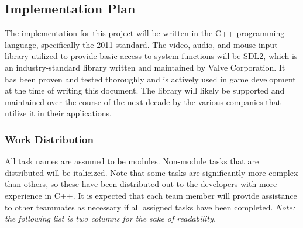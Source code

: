 \documentclass{article}
\begin{document}
	\subsection{Implementation Plan}
    The implementation for this project will be written in the C++ programming language, specifically the 2011 standard. The video, audio, and mouse input library utilized to provide basic access to system functions will be SDL2, which is an industry-standard library written and maintained by Valve Corporation. It has been proven and tested thoroughly and is actively used in game development at the time of writing this document. The library will likely be supported and maintained over the course of the next decade by the various companies that utilize it in their applications.
    \subsubsection{Work Distribution}
      All task names are assumed to be modules. Non-module tasks that are distributed will be italicized. Note that some tasks are significantly more complex than others, so these have been distributed out to the developers with more experience in C++. It is expected that each team member will provide assistance to other teammates as necessary if all assigned tasks have been completed. \emph{Note: the following list is two columns for the sake of readability.}
\end{document}
